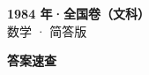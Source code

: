 \documentclass[zihao=-4, a4paper]{ctexart}
\begin{document}
\begin{center}
  {\Large\bfseries 1984 年·全国卷（文科）}\\[4pt]
  {\large 数学 · 简答版}
\end{center}
\medskip
{}

\clearpage
{}
\begin{center}{\Large\bfseries 答案速查}\end{center}
\medskip

\end{document}
